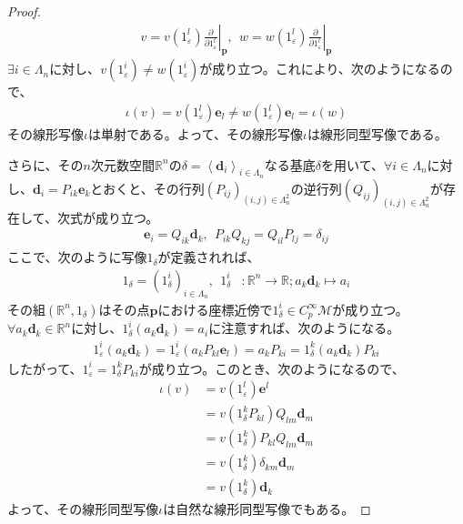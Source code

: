 \documentclass[dvipdfmx]{jsarticle}
\begin{document}
\begin{proof}
\begin{align*}
    v=v\left(1_\varepsilon^l \right) \left. \frac{\partial }{\partial 1_\varepsilon^l } \right|_\mathbf{p},\ \ w=w\left(1_\varepsilon^l \right) \left. \frac{\partial }{\partial 1_\varepsilon^l } \right|_\mathbf{p}
  \end{align*}
  $\exists i\in \varLambda_n $に対し、$v\left(1_\varepsilon^i \right) \ne w\left(1_\varepsilon^i \right)$が成り立つ。これにより、次のようになるので、
  \begin{align*}
    \iota \left(v\right) =v\left(1_\varepsilon^l \right) \mathbf{e}_l \ne w\left(1_\varepsilon^l \right) \mathbf{e}_l =\iota \left(w\right)
  \end{align*}
  その線形写像$\iota $は単射である。よって、その線形写像$\iota $は線形同型写像である。\par
  さらに、その$n$次元数空間$\mathbb{R}^n $の$\delta =\left\langle \mathbf{d}_i \right\rangle_{i\in \varLambda_n }$なる基底$\delta $を用いて、$\forall i\in \varLambda_n $に対し、$\mathbf{d}_i =P_{ik} \mathbf{e}_k $とおくと、その行列$\left(P_{ij}\right)_{\left(i,j\right)\in \varLambda_n^2 } $の逆行列$\left(Q_{ij}\right)_{\left(i,j\right)\in \varLambda_n^2 }$が存在して、次式が成り立つ。
  \begin{align*}
    \mathbf{e}_i =Q_{ik} \mathbf{d}_k ,\ \ P_{ik} Q_{kj} =Q_{il} P_{lj} =\delta_{ij}
  \end{align*}
  ここで、次のように写像$1_\delta $が定義されれば、
  \begin{align*}
    1_\delta =\left( 1_\delta^i \right)_{i\in \varLambda_n },\ \ 1_\delta^i &:\mathbb{R}^n \rightarrow \mathbb{R} ;a_k \mathbf{d}_k \mapsto a_i 
  \end{align*}
  その組$\left(\mathbb{R}^n ,1_\delta \right)$はその点$\mathbf{p}$における座標近傍で$1_\delta^i \in C^\infty_p \mathcal{M}$が成り立つ。$\forall a_k \mathbf{d}_k \in \mathbb{R}^n $に対し、$1_\delta^i \left(a_k \mathbf{d}_k \right) =a_i $に注意すれば、次のようになる。
  \begin{align*}
    1_\varepsilon^i \left(a_k \mathbf{d}_k \right) =1_\varepsilon^i \left( a_k P_{kl} \mathbf{e}_l \right)= a_k P_{ki} =1_\delta^k \left( a_k \mathbf{d}_k \right) P_{ki}
  \end{align*}
  したがって、$1_\varepsilon^i =1_\delta^k P_{ki}$が成り立つ。このとき、次のようになるので、
  \begin{align*}
    \iota \left( v\right) &= v\left(1_\varepsilon^l \right) \mathbf{e}^l \\
    &= v\left(1_\delta^k P_{kl} \right) Q_{lm} \mathbf{d}_m \\
    &= v\left(1_\delta^k \right) P_{kl} Q_{lm} \mathbf{d}_m \\
    &= v\left(1_\delta^k \right) \delta_{km} \mathbf{d}_m \\
    &= v\left(1_\delta^k \right) \mathbf{d}_k
  \end{align*}
  よって、その線形同型写像$\iota $は自然な線形同型写像でもある。
\end{proof}
\end{document}
